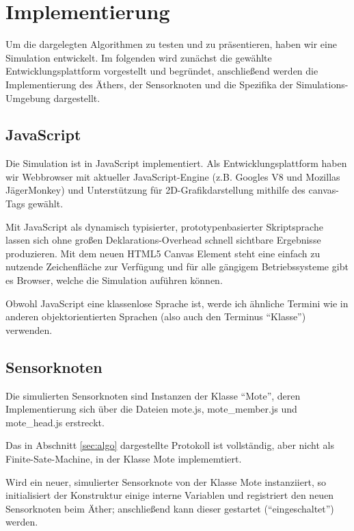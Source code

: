 \section{Implementierung} \label{sec:impl}

Um die dargelegten Algorithmen zu testen und zu präsentieren, haben wir
eine Simulation entwickelt. Im folgenden wird zunächst die gewählte
Entwicklungsplattform vorgestellt und begründet, anschließend werden die
Implementierung des Äthers, der Sensorknoten und die Spezifika der
Simulations-Umgebung dargestellt.

\subsection{JavaScript}

Die Simulation ist in JavaScript implementiert. Als
Entwicklungsplattform haben wir Webbrowser mit aktueller
JavaScript-Engine (z.B. Googles V8 und Mozillas JägerMonkey) und
Unterstützung für 2D-Grafikdarstellung mithilfe des canvas-Tags gewählt.

Mit JavaScript als dynamisch typisierter, prototypenbasierter
Skriptsprache lassen sich ohne großen Deklarations-Overhead schnell
sichtbare Ergebnisse produzieren. Mit dem neuen HTML5 Canvas Element
steht eine einfach zu nutzende Zeichenfläche zur Verfügung und für alle
gängigem Betriebssysteme gibt es Browser, welche die Simulation auführen
können.

Obwohl JavaScript eine klassenlose Sprache ist, werde ich ähnliche
Termini wie in anderen objektorientierten Sprachen (also auch den
Terminus ``Klasse'') verwenden.

\subsection{Sensorknoten}

Die simulierten Sensorknoten sind Instanzen der Klasse ``Mote'', deren
Implementierung sich über die Dateien mote.js, mote\_member.js und
mote\_head.js erstreckt.

Das in Abschnitt \ref{sec:algo} dargestellte Protokoll ist vollständig, aber
nicht als Finite-Sate-Machine, in der Klasse Mote implememtiert.

Wird ein neuer, simulierter Sensorknote von der Klasse Mote instanziiert,
so initialisiert der Konstruktur einige interne Variablen und registriert
den neuen Sensorknoten beim Äther; anschließend kann dieser gestartet
(``eingeschaltet'') werden.

